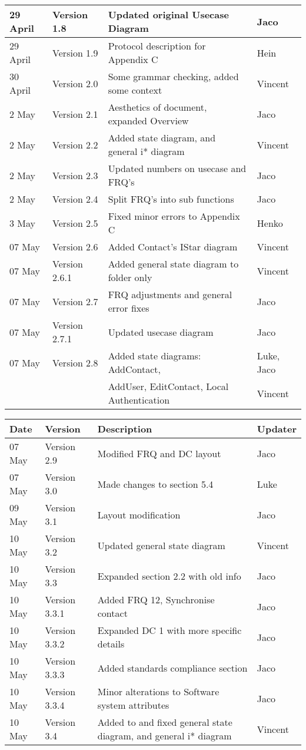 \begin{center}
\begin{tabular}{|l|l|l|l|}
\hline
29 April & Version 1.8 & Updated original Usecase Diagram& Jaco\\
\hline
29 April & Version 1.9 & Protocol description for Appendix C& Hein\\
\hline
30 April & Version 2.0 & Some grammar checking, added some context & Vincent\\
\hline
2 May & Version 2.1 & Aesthetics of document, expanded Overview& Jaco\\
\hline
2 May & Version 2.2 & Added state diagram, and general i* diagram & Vincent\\
\hline
2 May & Version 2.3 & Updated numbers on usecase and FRQ's & Jaco\\
\hline
2 May & Version 2.4 & Split FRQ's into sub functions& Jaco\\
\hline
3 May & Version 2.5 & Fixed minor errors to Appendix C& Henko\\
\hline
07 May & Version 2.6 & Added Contact's IStar diagram & Vincent\\
\hline
07 May & Version 2.6.1 & Added general state diagram to folder only & Vincent\\
\hline
07 May & Version 2.7 & FRQ adjustments and general error fixes & Jaco\\
\hline
07 May & Version 2.7.1 & Updated usecase diagram& Jaco\\
\hline
07 May & Version 2.8 &Added state diagrams: AddContact, &Luke, Jaco\\
&&AddUser, EditContact, Local Authentication&Vincent\\
\hline
\end{tabular}

\begin{tabular}{|l|l|l|l|}

\hline
\textbf{Date} & \textbf{Version} & \textbf{Description}&\textbf{Updater}\\ 
\hline
07 May & Version 2.9 & Modified FRQ and DC layout & Jaco\\
\hline
07 May & Version 3.0 & Made changes to section 5.4 & Luke\\
\hline
09 May & Version 3.1 & Layout modification & Jaco\\
\hline
10 May & Version 3.2 & Updated general state diagram & Vincent\\
\hline
10 May & Version 3.3 & Expanded section 2.2 with old info& Jaco\\
\hline
10 May & Version 3.3.1 & Added FRQ 12, Synchronise contact& Jaco\\
\hline
10 May & Version 3.3.2 & Expanded DC 1 with more specific details& Jaco\\
\hline
10 May & Version 3.3.3 & Added standards compliance section& Jaco\\
\hline
10 May & Version 3.3.4 & Minor alterations to Software system attributes& Jaco\\
\hline
10 May & Version 3.4 & Added to and fixed general state diagram, and general i* diagram & Vincent\\
\hline
\end{tabular}


\end{center}
